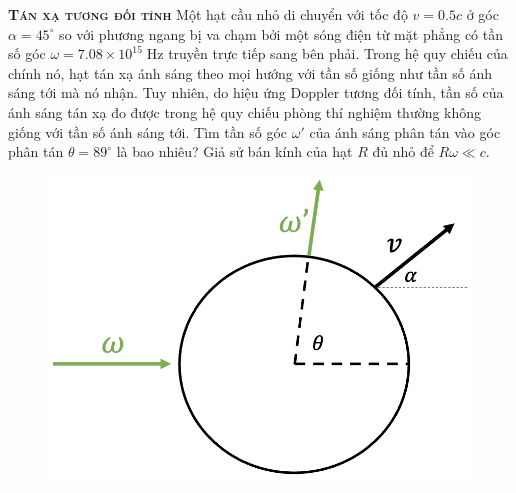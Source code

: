 

\begin{problem}
	
	\textbf{\textsc{Tán xạ tương đối tính}} Một hạt cầu nhỏ di chuyển với tốc độ $v=0.5c$ ở góc $\alpha=45^{\circ}$ so với phương ngang bị va chạm bởi một sóng điện từ mặt phẳng có tần số góc $\omega=7.08\times 10^{15} \;\mathrm{Hz}$ truyền trực tiếp sang bên phải. Trong hệ quy chiếu của chính nó, hạt tán xạ ánh sáng theo mọi hướng với tần số giống như tần số ánh sáng tới mà nó nhận. Tuy nhiên, do hiệu ứng Doppler tương đối tính, tần số của ánh sáng tán xạ đo được trong hệ quy chiếu phòng thí nghiệm thường không giống với tần số ánh sáng tới. Tìm tần số góc $\omega'$ của ánh sáng phân tán vào góc phân tán $\theta=89^{\circ}$ là bao nhiêu? Giả sử bán kính của hạt $R$ đủ nhỏ để $R\omega \ll c$.
	\FloatBarrier
	\begin{figure}[h]
		\centering
		\includegraphics[width=0.4\linewidth]{problems/figures/rel_sca_fig.png}
		\label{fig:enter-label}
	\end{figure}
	\FloatBarrier
\end{problem}
